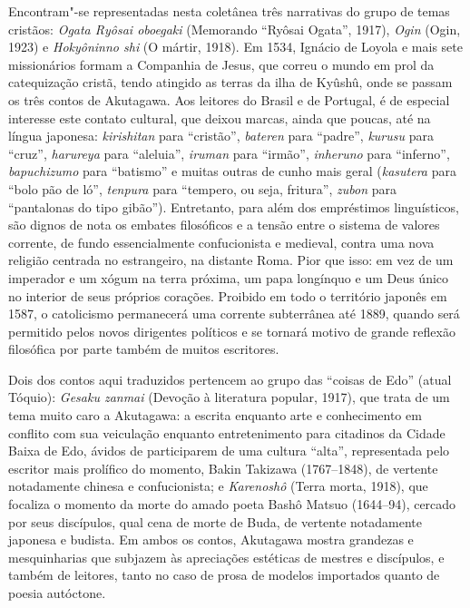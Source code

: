 Encontram"-se representadas nesta coletânea três narrativas do grupo de
temas cristãos: \textit{Ogata Ryôsai oboegaki} (Memorando ``Ryôsai Ogata'', 
1917), \textit{Ogin} (Ogin, 1923) e
\textit{Hokyôninno shi}  (O mártir, 1918).  Em
1534, Ignácio de Loyola e mais sete missionários formam a Companhia de
Jesus, que correu o mundo em prol da catequização cristã, tendo
atingido as terras da ilha de Kyûshû, onde se passam os três contos de
Akutagawa. Aos leitores do Brasil e de Portugal, é de especial
interesse este contato cultural, que deixou marcas, ainda que poucas,
até na língua japonesa: \textit{kirishitan} para ``cristão'',
\textit{bateren} para ``padre'', \textit{kurusu} para ``cruz'',
\textit{harureya} para ``aleluia'', \textit{iruman} para ``irmão'',
\textit{inheruno} para ``inferno'', \textit{bapuchizumo} para ``batismo''
e muitas outras de cunho mais geral (\textit{kasutera} para ``bolo pão
de ló'', \textit{tenpura} para ``tempero, ou seja, fritura'',
\textit{zubon} para ``pantalonas do tipo gibão''). Entretanto, para além
dos empréstimos linguísticos, são dignos de nota os embates filosóficos 
e a tensão entre o sistema de valores corrente, de fundo essencialmente
confucionista e medieval, contra uma nova religião centrada no
estrangeiro, na distante Roma. Pior que isso: em vez de um imperador e um
xógum na terra próxima, um papa longínquo e um Deus único no interior
de seus próprios corações. Proibido em todo o território japonês em
1587, o catolicismo permanecerá uma corrente subterrânea até 1889, 
quando será permitido pelos novos dirigentes políticos e se tornará
motivo de grande reflexão filosófica por parte também de muitos escritores.

Dois dos contos aqui traduzidos pertencem ao grupo das ``coisas de Edo''
(atual Tóquio): \textit{Gesaku zanmai} (Devoção à literatura popular, 1917), 
que trata de um tema muito caro a Akutagawa: a escrita
enquanto arte e conhecimento em conflito com sua veiculação enquanto
entretenimento para citadinos da Cidade Baixa de Edo, ávidos de
participarem de uma cultura ``alta'', representada pelo escritor mais
prolífico do momento, Bakin Takizawa  (1767--1848), de vertente
notadamente chinesa e confucionista; e \textit{Karenoshô}  (Terra morta, 1918), 
que focaliza o momento da morte do amado poeta Bashô Matsuo (1644--94), 
cercado por seus discípulos, qual cena de morte de
Buda, de vertente notadamente japonesa e budista. Em ambos os contos, 
Akutagawa mostra grandezas e mesquinharias que subjazem às apreciações
estéticas de mestres e discípulos, e também de leitores, tanto no caso
de prosa de modelos importados quanto de poesia autóctone.

